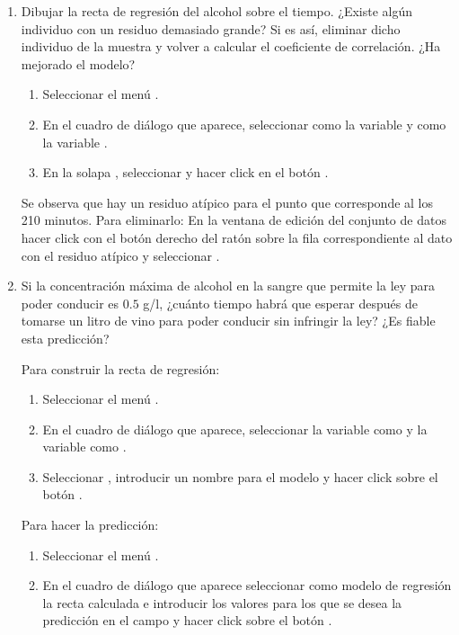 \begin{enumerate}[leftmargin=*]
\begin{enumerate}
\item Dibujar la recta de regresión del alcohol sobre el tiempo. 
¿Existe algún individuo con un residuo demasiado grande? 
Si es así, eliminar dicho individuo de la muestra y volver a calcular el coeficiente de correlación. 
¿Ha mejorado el modelo?
\begin{indicacion}{
\begin{enumerate}
\item Seleccionar el menú .
\item En el cuadro de diálogo que aparece, seleccionar como  la variable  y como
 la variable .
\item En la solapa , seleccionar  y hacer click en el botón
.
\end{enumerate}
Se observa que hay un residuo atípico para el punto que corresponde al los 210 minutos. 
Para eliminarlo:
En la ventana de edición del conjunto de datos hacer click con el botón derecho del ratón sobre la fila correspondiente
al dato con el residuo atípico y seleccionar .}
\end{indicacion}


\item Si la concentración máxima de alcohol en la sangre que permite la ley para poder conducir es $0.5$ g/l, ¿cuánto
tiempo habrá que esperar después de tomarse un litro de vino para poder conducir sin infringir la ley? 
¿Es fiable esta predicción?
\begin{indicacion}{
Para construir la recta de regresión:
\begin{enumerate}
\item Seleccionar el menú .
\item En el cuadro de diálogo que aparece, seleccionar la variable  como  y la
variable  como .
\item Seleccionar , introducir un nombre para el modelo y hacer click sobre el botón .
\end{enumerate}
Para hacer la predicción:
\begin{enumerate}
\item Seleccionar el menú .
\item En el cuadro de diálogo que aparece seleccionar como modelo de regresión la recta calculada e introducir los
valores para los que se desea la predicción en el campo  y hacer click sobre el botón
.
\end{enumerate}}
\end{indicacion}
\end{enumerate}



\end{enumerate}
